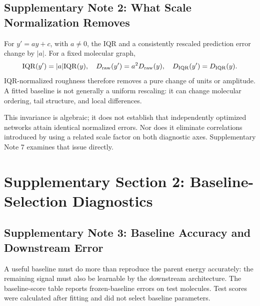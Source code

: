 \subsection*{Supplementary Note 2: What Scale Normalization Removes}
For \(y'=ay+c\), with \(a\ne0\), the IQR and a consistently rescaled prediction error change by \(|a|\). For a fixed molecular graph,
\begin{equation}
 {\rm IQR}(y')=|a|{\rm IQR}(y),\quad
 D_{\rm raw}(y')=a^2D_{\rm raw}(y),\quad
 D_{\rm IQR}(y')=D_{\rm IQR}(y).
\end{equation}
IQR-normalized roughness therefore removes a pure change of units or amplitude. A fitted baseline is not generally a uniform rescaling: it can change molecular ordering, tail structure, and local differences.


This invariance is algebraic; it does not establish that independently optimized networks attain identical normalized errors. Nor does it eliminate correlations introduced by using a related scale factor on both diagnostic axes. Supplementary Note 7 examines that issue directly.

\clearpage
\section*{Supplementary Section 2: Baseline-Selection Diagnostics}
\subsection*{Supplementary Note 3: Baseline Accuracy and Downstream Error}
A useful baseline must do more than reproduce the parent energy accurately: the remaining signal must also be learnable by the downstream architecture. The baseline-score table reports frozen-baseline errors on test molecules. Test scores were calculated after fitting and did not select baseline parameters.

